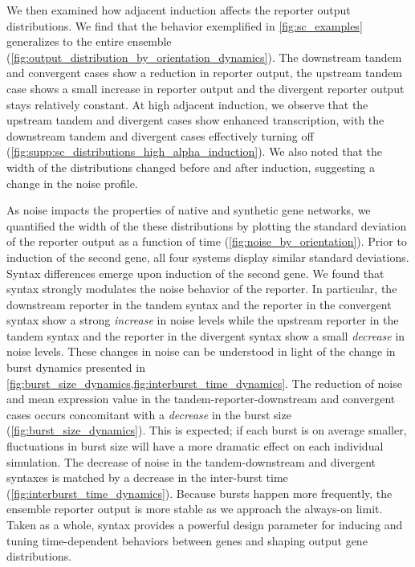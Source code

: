 \documentclass[11pt]{article}
\begin{document}
We then examined how adjacent induction affects the reporter output distributions. We find that the behavior exemplified in \cref{fig:sc_examples} generalizes to the entire ensemble (\cref{fig:output_distribution_by_orientation_dynamics}). The downstream tandem and convergent cases show a reduction in reporter output, the upstream tandem case shows a small increase in reporter output and the divergent reporter output stays relatively constant. At high adjacent induction, we observe that the upstream tandem and divergent cases show enhanced transcription, with the downstream tandem and divergent cases effectively turning off (\cref{fig:supp:sc_distributions_high_alpha_induction}).  We also noted that the width of the distributions changed before and after induction, suggesting a change in the noise profile.

As noise impacts the properties of native and synthetic gene networks, we quantified the width of the these distributions by plotting the standard deviation of the reporter output as a function of time (\cref{fig:noise_by_orientation}). Prior to induction of the second gene, all four systems display similar standard deviations. Syntax differences emerge upon induction of the second gene. We found that syntax strongly modulates the noise behavior of the reporter. In particular, the downstream reporter in the tandem syntax and the reporter in the convergent syntax show a strong \emph{increase} in noise levels while the upstream reporter in the tandem syntax and the reporter in the divergent syntax show a small \emph{decrease} in noise levels. These changes in noise can be understood in light of the change in burst dynamics presented in \cref{fig:burst_size_dynamics,fig:interburst_time_dynamics}.
The reduction of noise and mean expression value in the tandem-reporter-downstream and convergent cases occurs concomitant with a \emph{decrease} in the burst size (\cref{fig:burst_size_dynamics}). This is expected; if each burst is on average smaller, fluctuations in burst size will have a more dramatic effect on each individual simulation. The decrease of noise in the tandem-downstream and divergent syntaxes is matched by a decrease in the inter-burst time (\cref{fig:interburst_time_dynamics}). Because bursts happen more frequently, the ensemble reporter output is more stable as we approach the always-on limit.
Taken as a whole, syntax provides a powerful design parameter for inducing and tuning time-dependent behaviors between genes and shaping output gene distributions.
\end{document}
